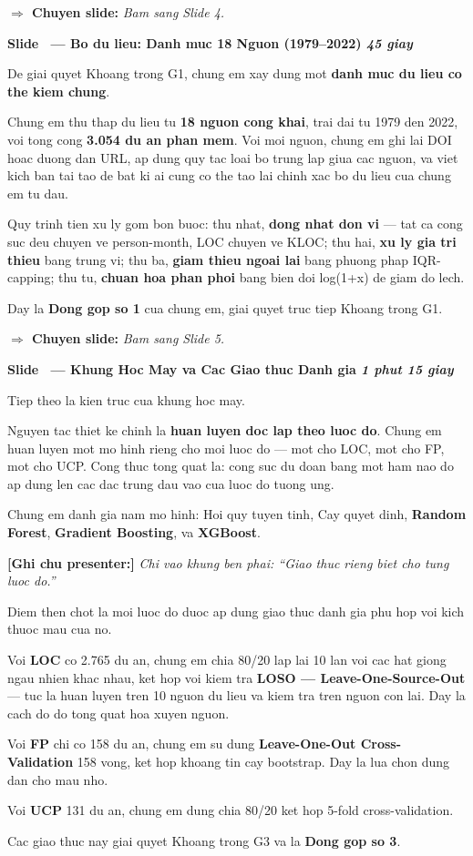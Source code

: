 \documentclass[12pt,a4paper]{article}
\newcounter{slidenum}
\newcommand{\slide}[2]{%
  \stepcounter{slidenum}%
  \vspace{0.6em}
  \begin{mdframed}[backgroundcolor=slideblue!90, linecolor=slideblue,
    leftmargin=0pt, rightmargin=0pt, innerleftmargin=10pt,
    innerrightmargin=10pt, innertopmargin=6pt, innerbottommargin=6pt]
    \color{white}\large\bfseries Slide \theslidenum\ --- #1
    \hfill \textcolor{yellow!80!white}{\normalsize\itshape #2}
  \end{mdframed}
  \vspace{0.3em}
}
\newcommand{\say}[1]{%
  \begin{mdframed}[backgroundcolor=bglight, linecolor=slideblue!40,
    leftmargin=0pt, rightmargin=0pt, innerleftmargin=12pt,
    innerrightmargin=12pt, innertopmargin=8pt, innerbottommargin=8pt,
    linewidth=1.5pt]
  #1
  \end{mdframed}
}
\newcommand{\pointnote}[1]{%
  \vspace{0.2em}
  \noindent\textcolor{noteorange}{\bfseries [Ghi chu presenter:]} \textit{#1}
  \vspace{0.2em}
}
\newcommand{\transition}[1]{%
  \vspace{0.15em}
  \noindent\textcolor{timergreen}{\bfseries $\Rightarrow$ Chuyen slide:} \textit{#1}
  \vspace{0.3em}
}
\begin{document}
\transition{Bam sang Slide 4.}

\slide{Bo du lieu: Danh muc 18 Nguon (1979--2022)}{45 giay}

\say{
De giai quyet Khoang trong G1, chung em xay dung mot \textbf{danh muc du lieu co the kiem chung}.

Chung em thu thap du lieu tu \textbf{18 nguon cong khai}, trai dai tu 1979 den 2022, voi tong cong \textbf{3.054 du an phan mem}. Voi moi nguon, chung em ghi lai DOI hoac duong dan URL, ap dung quy tac loai bo trung lap giua cac nguon, va viet kich ban tai tao de bat ki ai cung co the tao lai chinh xac bo du lieu cua chung em tu dau.

Quy trinh tien xu ly gom bon buoc: thu nhat, \textbf{dong nhat don vi} --- tat ca cong suc deu chuyen ve person-month, LOC chuyen ve KLOC; thu hai, \textbf{xu ly gia tri thieu} bang trung vi; thu ba, \textbf{giam thieu ngoai lai} bang phuong phap IQR-capping; thu tu, \textbf{chuan hoa phan phoi} bang bien doi log(1+x) de giam do lech.

Day la \textbf{Dong gop so 1} cua chung em, giai quyet truc tiep Khoang trong G1.
}

\transition{Bam sang Slide 5.}

\slide{Khung Hoc May va Cac Giao thuc Danh gia}{1 phut 15 giay}

\say{
Tiep theo la kien truc cua khung hoc may.

Nguyen tac thiet ke chinh la \textbf{huan luyen doc lap theo luoc do}. Chung em huan luyen mot mo hinh rieng cho moi luoc do --- mot cho LOC, mot cho FP, mot cho UCP. Cong thuc tong quat la: cong suc du doan bang mot ham nao do ap dung len cac dac trung dau vao cua luoc do tuong ung.

Chung em danh gia nam mo hinh: Hoi quy tuyen tinh, Cay quyet dinh, \textbf{Random Forest}, \textbf{Gradient Boosting}, va \textbf{XGBoost}.
}

\pointnote{Chi vao khung ben phai: ``Giao thuc rieng biet cho tung luoc do.''}

\say{
Diem then chot la moi luoc do duoc ap dung giao thuc danh gia phu hop voi kich thuoc mau cua no.

Voi \textbf{LOC} co 2.765 du an, chung em chia 80/20 lap lai 10 lan voi cac hat giong ngau nhien khac nhau, ket hop voi kiem tra \textbf{LOSO --- Leave-One-Source-Out} --- tuc la huan luyen tren 10 nguon du lieu va kiem tra tren nguon con lai. Day la cach do do tong quat hoa xuyen nguon.

Voi \textbf{FP} chi co 158 du an, chung em su dung \textbf{Leave-One-Out Cross-Validation} 158 vong, ket hop khoang tin cay bootstrap. Day la lua chon dung dan cho mau nho.

Voi \textbf{UCP} 131 du an, chung em dung chia 80/20 ket hop 5-fold cross-validation.

Cac giao thuc nay giai quyet Khoang trong G3 va la \textbf{Dong gop so 3}.
}
\end{document}
